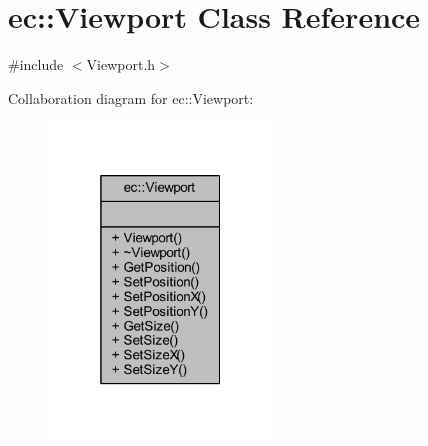 \hypertarget{classec_1_1_viewport}{}\section{ec\+:\+:Viewport Class Reference}
\label{classec_1_1_viewport}


{\ttfamily \#include $<$Viewport.\+h$>$}



Collaboration diagram for ec\+:\+:Viewport\+:
\nopagebreak
\begin{figure}[H]
\begin{center}
\leavevmode
\includegraphics[width=169pt]{classec_1_1_viewport__coll__graph}
\end{center}
\end{figure}
